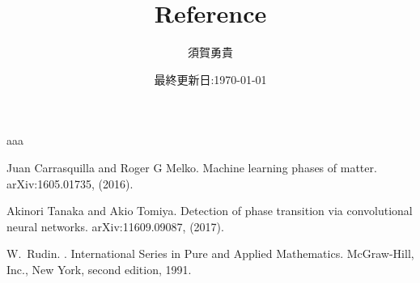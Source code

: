 \documentclass[a4paper,11pt]{jsarticle}
\begin{document}
\title{Reference}
\author{須賀勇貴}
\date{最終更新日:\today}
\maketitle

aaa
\begin{thebibliography}{9}

  Juan Carrasquilla and Roger G Melko.
  \newblock Machine learning phases of matter.
  \newblock arXiv:1605.01735, (2016).

  Akinori Tanaka and Akio Tomiya.
  \newblock Detection of phase transition via convolutional neural networks.
  \newblock arXiv:11609.09087, (2017).

  W.~Rudin.
  .
  \newblock International Series in Pure and Applied Mathematics. McGraw-Hill, Inc., New York, second edition, 1991.

\end{thebibliography}
\end{document}
